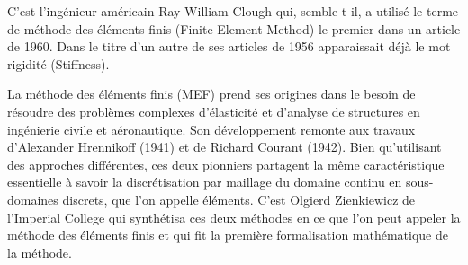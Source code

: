 \medskip
\begin{histoire}%
C'est l'ingénieur américain Ray William Clough qui,
semble-t-il, a utilisé le terme de méthode des éléments finis (Finite Element Method) le premier dans
un article de 1960.
Dans le titre d'un autre de ses articles de 1956 apparaissait déjà le mot rigidité (Stiffness).

\medskip
{}



\medskip
La méthode des éléments finis (MEF) prend ses origines dans le besoin de résoudre des problèmes
complexes d'élasticité et d'analyse de structures en ingénierie civile et aéronautique.
Son développement remonte aux travaux d'Alexander Hrennikoff (1941) et de Richard Courant (1942).
Bien qu'utilisant des approches différentes, ces deux pionniers partagent la même caractéristique
essentielle à savoir la discrétisation par maillage du domaine continu en sous-domaines discrets, que l'on
appelle éléments.
C'est Olgierd Zienkiewicz de l'Imperial College
qui synthétisa ces deux méthodes en ce que l'on peut appeler la méthode des éléments finis et qui fit la première formalisation
mathématique de la méthode.


\end{histoire}

